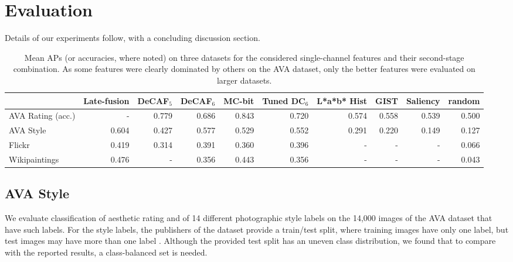 
\section{Evaluation}

Details of our experiments follow, with a concluding discussion section.

\begin{table*}
\caption{
    Mean APs (or accuracies, where noted) on three datasets for the considered single-channel features and their second-stage combination.
    As some features were clearly dominated by others on the AVA dataset, only the better features were evaluated on larger datasets.
}
\label{tab:mean_aps}
\centering
\small{
\begin{tabular}{lrrrrrrrrr}
\toprule
{} &  Late-fusion &  DeCAF$_5$ &  DeCAF$_6$ &  MC-bit &  Tuned DC$_6$ &  L*a*b* Hist &  GIST &  Saliency &  random \\
\midrule
AVA Rating (acc.) &                  - &    0.779 &    0.686 &   0.843 &               0.720 &             0.574 & 0.558 &                 0.539 &   0.500 \\
AVA Style             &                  0.604 &    0.427 &    0.577 &   0.529 &               0.552 &             0.291 & 0.220 &                 0.149 &   0.127 \\
Flickr                &                  0.419 &    0.314 &    0.391 &   0.360 &               0.396 &                 - &     - &                     - &   0.066 \\
Wikipaintings         &                  0.476 &        - &    0.356 &   0.443 &               0.356 &                 - &     - &                     - &   0.043 \\
\bottomrule
\end{tabular}
}
\end{table*}

\subsection{AVA Style}

We evaluate classification of aesthetic rating and of 14 different photographic style labels on the 14,000 images of the AVA dataset that have such labels.
For the style labels, the publishers of the dataset provide a train/test split, where training images have only one label, but test images may have more than one label \cite{Murray-CVPR-2012}.
Although the provided test split has an uneven class distribution, we found that to compare with the reported results, a class-balanced set is needed.

